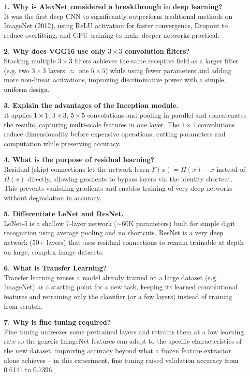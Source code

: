 \documentclass[11pt]{article}
\begin{document}
\textbf{1. Why is AlexNet considered a breakthrough in deep learning?}\\
It was the first deep CNN to significantly outperform traditional methods
on ImageNet (2012), using ReLU activation for faster convergence, Dropout
to reduce overfitting, and GPU training to make deeper networks practical.

\textbf{2. Why does VGG16 use only $3\times3$ convolution filters?}\\
Stacking multiple $3\times3$ filters achieves the same receptive field as
a larger filter (e.g. two $3\times3$ layers $\approx$ one $5\times5$)
while using fewer parameters and adding more non-linear activations,
improving discriminative power with a simple, uniform design.

\textbf{3. Explain the advantages of the Inception module.}\\
It applies $1\times1$, $3\times3$, $5\times5$ convolutions and pooling in
parallel and concatenates the results, capturing multi-scale features in
one layer. The $1\times1$ convolutions reduce dimensionality before
expensive operations, cutting parameters and computation while preserving
accuracy.

\textbf{4. What is the purpose of residual learning?}\\
Residual (skip) connections let the network learn $F(x)=H(x)-x$ instead
of $H(x)$ directly, allowing gradients to bypass layers via the identity
shortcut. This prevents vanishing gradients and enables training of very
deep networks without degradation in accuracy.

\textbf{5. Differentiate LeNet and ResNet.}\\
LeNet-5 is a shallow 7-layer network ($\sim$60K parameters) built for
simple digit recognition using average pooling and no shortcuts. ResNet
is a very deep network (50+ layers) that uses residual connections to
remain trainable at depth on large, complex image datasets.

\textbf{6. What is Transfer Learning?}\\
Transfer learning reuses a model already trained on a large dataset (e.g.
ImageNet) as a starting point for a new task, keeping its learned
convolutional features and retraining only the classifier (or a few
layers) instead of training from scratch.

\textbf{7. Why is fine tuning required?}\\
Fine tuning unfreezes some pretrained layers and retrains them at a low
learning rate so the generic ImageNet features can adapt to the specific
characteristics of the new dataset, improving accuracy beyond what a
frozen feature extractor alone achieves -- in this experiment, fine
tuning raised validation accuracy from 0.6141 to 0.7396.
\end{document}
